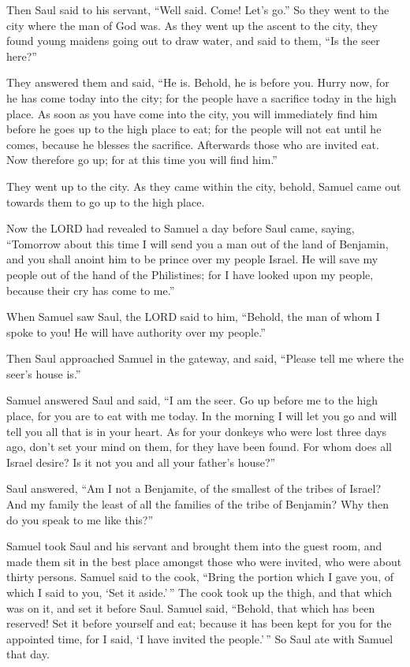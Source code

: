  Then Saul said to his servant, ``Well said. Come! Let's
go.'' So they went to the city where the man of God was. 
As they went up the ascent to the city, they found young maidens going
out to draw water, and said to them, ``Is the seer here?''

 They answered them and said, ``He is. Behold, he is before
you. Hurry now, for he has come today into the city; for the people have
a sacrifice today in the high place.  As soon as you have
come into the city, you will immediately find him before he goes up to
the high place to eat; for the people will not eat until he comes,
because he blesses the sacrifice. Afterwards those who are invited eat.
Now therefore go up; for at this time you will find him.''

 They went up to the city. As they came within the city,
behold, Samuel came out towards them to go up to the high place.

 Now the LORD had revealed to Samuel a day before Saul
came, saying,  ``Tomorrow about this time I will send you a
man out of the land of Benjamin, and you shall anoint him to be prince
over my people Israel. He will save my people out of the hand of the
Philistines; for I have looked upon my people, because their cry has
come to me.''

 When Samuel saw Saul, the LORD said to him, ``Behold, the
man of whom I spoke to you! He will have authority over my people.''

 Then Saul approached Samuel in the gateway, and said,
``Please tell me where the seer's house is.''

 Samuel answered Saul and said, ``I am the seer. Go up
before me to the high place, for you are to eat with me today. In the
morning I will let you go and will tell you all that is in your heart.
 As for your donkeys who were lost three days ago, don't
set your mind on them, for they have been found. For whom does all
Israel desire? Is it not you and all your father's house?''

 Saul answered, ``Am I not a Benjamite, of the smallest of
the tribes of Israel? And my family the least of all the families of the
tribe of Benjamin? Why then do you speak to me like this?''

 Samuel took Saul and his servant and brought them into the
guest room, and made them sit in the best place amongst those who were
invited, who were about thirty persons.  Samuel said to the
cook, ``Bring the portion which I gave you, of which I said to you, `Set
it aside.'\,''  The cook took up the thigh, and that which
was on it, and set it before Saul. Samuel said, ``Behold, that which has
been reserved! Set it before yourself and eat; because it has been kept
for you for the appointed time, for I said, `I have invited the
people.'\,'' So Saul ate with Samuel that day.

